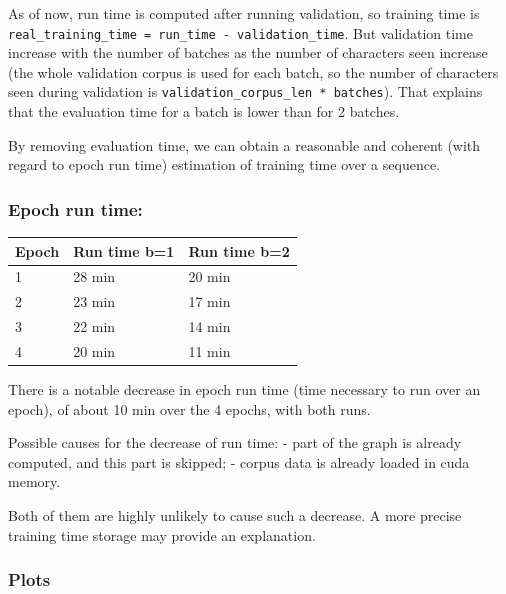 As of now, run time is computed after running validation, so training
time is \lstinline!real_training_time = run_time - validation_time!. But
validation time increase with the number of batches as the number of
characters seen increase (the whole validation corpus is used for each
batch, so the number of characters seen during validation is
\lstinline!validation_corpus_len * batches!). That explains that the
evaluation time for a batch is lower than for 2 batches.

By removing evaluation time, we can obtain a reasonable and coherent
(with regard to epoch run time) estimation of training time over a
sequence.

\subsubsection{Epoch run time:}

\begin{longtable}[]{@{}lll@{}}
\hline
Epoch & Run time b=1 & Run time b=2\tabularnewline
\hline
\endhead
1 & 28 min & 20 min\tabularnewline
2 & 23 min & 17 min\tabularnewline
3 & 22 min & 14 min\tabularnewline
4 & 20 min & 11 min\tabularnewline
\hline
\end{longtable}

There is a notable decrease in epoch run time (time necessary to run
over an epoch), of about 10 min over the 4 epochs, with both runs.

Possible causes for the decrease of run time: - part of the graph is
already computed, and this part is skipped; - corpus data is already
loaded in cuda memory.

Both of them are highly unlikely to cause such a decrease. A more
precise training time storage may provide an explanation.

\subsubsection{Plots}


